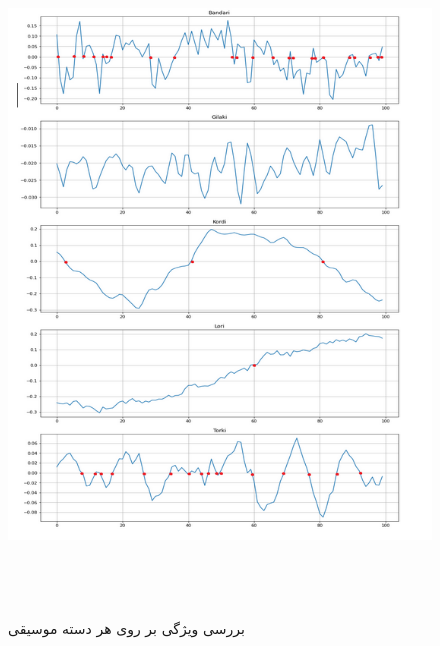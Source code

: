\documentclass[12pt,onecolumn,a4paper]{article}
\begin{document}
\begin{figure}
  \centering
  \includegraphics[width=23cm,height=18cm,keepaspectratio]{2.png}
  \caption{بررسی ویژگی  بر روی هر دسته موسیقی}
  \label{fig:ZeroCrossing}
\end{figure}
\end{document}
